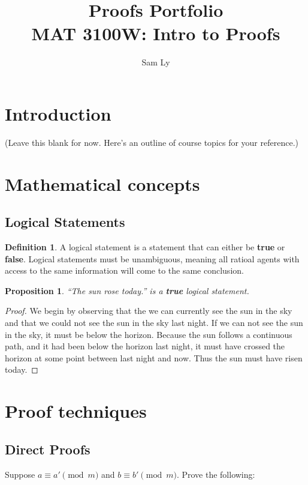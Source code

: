 \documentclass{article}
\title{Proofs Portfolio\\[5pt] \large MAT 3100W: Intro to Proofs}
\author{Sam Ly}
\newtheorem{proposition}{Proposition}
\theoremstyle{definition}
\newtheorem{definition}{Definition}
\begin{document}
\maketitle

\section{Introduction}
(Leave this blank for now. Here's an outline of course topics for your reference.)

\section{Mathematical concepts}

\subsection{Logical Statements}
\begin{definition}
    A logical statement is a statement that can either be \textbf{true} or \textbf{false}. 
    Logical statements must be unambiguous, meaning all ratioal agents with access 
    to the same information will come to the same conclusion. 
\end{definition}

\begin{proposition}
    ``The sun rose today.'' is a \textbf{true} logical statement.
\end{proposition}

\begin{proof}
    We begin by observing that the we can currently see the sun in the sky and 
    that we could not see the sun in the sky last night. If we can not see the 
    sun in the sky, it must be below the horizon. Because the sun follows a 
    continuous path, and it had been below the horizon last night, 
    it must have crossed the horizon at some point between last night and now. 
    Thus the sun must have risen today.
\end{proof}

\section{Proof techniques}

\subsection{Direct Proofs}
Suppose \(a \equiv a' \pmod{m}\) and \(b \equiv b' \pmod{m}\). Prove the
following:
\end{document}
